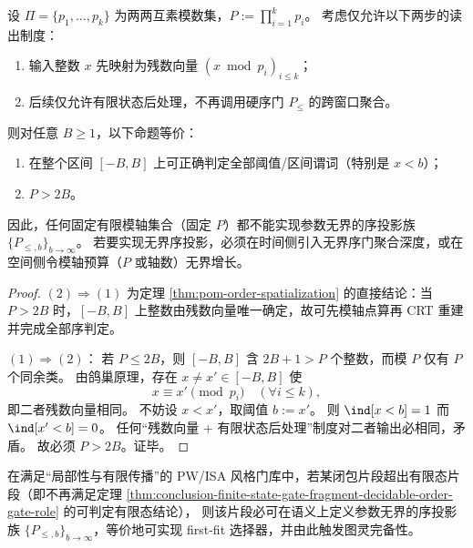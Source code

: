\begin{theorem}\label{thm:conclusion-crt-threshold-necessary-sufficient-for-order-readout}
设 \(\Pi=\{p_1,\dots,p_k\}\) 为两两互素模数集，\(P:=\prod_{i=1}^k p_i\)。
考虑仅允许以下两步的读出制度：
\begin{enumerate}
  \item 输入整数 \(x\) 先映射为残数向量 \((x\bmod p_i)_{i\le k}\)；
  \item 后续仅允许有限状态后处理，不再调用硬序门 \(P_{\le}\) 的跨窗口聚合。
\end{enumerate}
则对任意 \(B\ge 1\)，以下命题等价：
\begin{enumerate}
  \item 在整个区间 \([-B,B]\) 上可正确判定全部阈值/区间谓词（特别是 \(x<b\)）；
  \item \(P>2B\)。
\end{enumerate}
因此，任何固定有限模轴集合（固定 \(P\)）都不能实现参数无界的序投影族 \(\{P_{\le,b}\}_{b\to\infty}\)。
若要实现无界序投影，必须在时间侧引入无界序门聚合深度，或在空间侧令模轴预算（\(P\) 或轴数）无界增长。
\end{theorem}
\begin{proof}
\((2)\Rightarrow(1)\) 为定理 \ref{thm:pom-order-spatialization} 的直接结论：当 \(P>2B\) 时，\([-B,B]\) 上整数由残数向量唯一确定，故可先模轴点算再 CRT 重建并完成全部序判定。

\((1)\Rightarrow(2)\)：
若 \(P\le 2B\)，则 \([-B,B]\) 含 \(2B+1>P\) 个整数，而模 \(P\) 仅有 \(P\) 个同余类。
由鸽巢原理，存在 \(x\neq x'\in[-B,B]\) 使
\[
x\equiv x'\pmod{p_i}\quad(\forall i\le k),
\]
即二者残数向量相同。
不妨设 \(x<x'\)，取阈值 \(b:=x'\)。
则 \(\ind[x<b]=1\) 而 \(\ind[x'<b]=0\)。
任何“残数向量 + 有限状态后处理”制度对二者输出必相同，矛盾。
故必须 \(P>2B\)。证毕。
\end{proof}

\begin{conjecture}[非有限态片段的最小序投影判据]\label{conj:conclusion-minimal-non-finite-state-order-projection}
在满足“局部性与有限传播”的 PW/ISA 风格门库中，若某闭包片段超出有限态片段（即不再满足定理 \ref{thm:conclusion-finite-state-gate-fragment-decidable-order-gate-role} 的可判定有限态结论），
则该片段必可在语义上定义参数无界的序投影族 \(\{P_{\le,b}\}_{b\to\infty}\)，等价地可实现 first-fit 选择器，并由此触发图灵完备性。
\end{conjecture}

